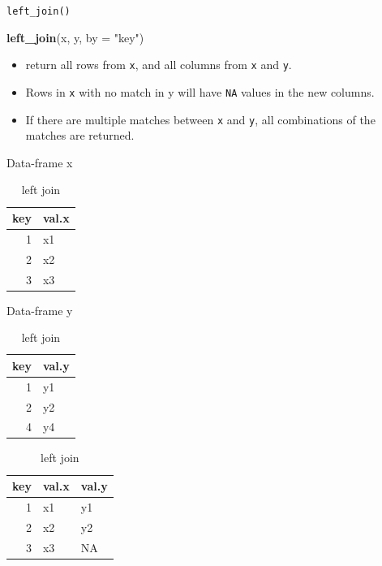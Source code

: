 \documentclass[ignorenonframetext,]{beamer}
\newenvironment{Shaded}{\begin{snugshade}}{\end{snugshade}}
\newcommand{\KeywordTok}[1]{\textcolor[rgb]{0.13,0.29,0.53}{\textbf{#1}}}
\newcommand{\DataTypeTok}[1]{\textcolor[rgb]{0.13,0.29,0.53}{#1}}
\newcommand{\StringTok}[1]{\textcolor[rgb]{0.31,0.60,0.02}{#1}}
\newcommand{\NormalTok}[1]{#1}
\providecommand{\tightlist}{%
  \setlength{\itemsep}{0pt}\setlength{\parskip}{0pt}}
\let\oldShaded\Shaded
\let\endoldShaded\endShaded
\renewenvironment{Shaded}{\footnotesize\oldShaded}{\endoldShaded}
\begin{document}
\begin{frame}[fragile]{\texttt{left\_join()}}

\begin{Shaded}
\begin{Highlighting}[]
\KeywordTok{left_join}\NormalTok{(x, y, }\DataTypeTok{by =} \StringTok{"key"}\NormalTok{)}
\end{Highlighting}
\end{Shaded}

\begin{itemize}
\tightlist
\item
  return all rows from \texttt{x}, and all columns from \texttt{x} and
  \texttt{y}.
\item
  Rows in \texttt{x} with no match in y will have \texttt{NA} values in
  the new columns.
\item
  If there are multiple matches between \texttt{x} and \texttt{y}, all
  combinations of the matches are returned.
\end{itemize}

\begin{table}[!htb]
    \begin{minipage}{.33\linewidth}
      \caption*{Data-frame x}
      \centering 
\begin{tabular}{rl}
\toprule
key & val.x\\
\midrule
1 & x1\\
2 & x2\\
3 & x3\\
\bottomrule
\end{tabular} \end{minipage}%
    \begin{minipage}{.33\linewidth}
      \centering
        \caption*{Data-frame y} 
\begin{tabular}{rl}
\toprule
key & val.y\\
\midrule
1 & y1\\
2 & y2\\
4 & y4\\
\bottomrule
\end{tabular} \end{minipage}%
    \begin{minipage}{.33\linewidth}
      \centering
        \caption*{left join} 
\begin{tabular}{rll}
\toprule
key & val.x & val.y\\
\midrule
1 & x1 & y1\\
2 & x2 & y2\\
3 & x3 & NA\\
\bottomrule
\end{tabular} \end{minipage} 
\end{table}

\end{frame}
\end{document}
